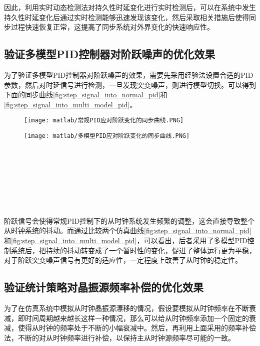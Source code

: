 因此，利用实时动态检测法对持久性时延变化进行实时检测后，可以在系统中发生持久性时延变化后通过实时检测能够迅速发现该变化，然后采取相关措施后使得同步过程快速恢复正常，这提高了同步系统对外界变化的快速响应性。

\subsection{验证多模型PID控制器对阶跃噪声的优化效果}
为了验证多模型PID控制器对阶跃噪声的效果，需要先采用经验法设置合适的PID参数，然后对时延信号进行检测，一旦发现突变噪声，则进行模型切换。可以得到下面的同步曲线\ref{fig:step_signal_into_normal_pid}和\ref{fig:step_signal_into_multi_model_pid}。
\begin{figure}[!hbp]
  \centering
  \begin{minipage}[b]{0.7\textwidth}
   \captionstyle{\centering}
   \centering
   \texttt{[image: matlab/常规PID应对阶跃变化的同步曲线.PNG]}
  \end{minipage}     
\end{figure}
\begin{figure}[htbp]
  \centering
  \begin{minipage}[b]{0.7\textwidth}
   \captionstyle{\centering}
   \centering
   \texttt{[image: matlab/多模型PID应对阶跃变化的同步曲线.PNG]}
  \end{minipage}     
\end{figure}
\\ \\ \\ \\ \\ \\ \\

阶跃信号会使得常规PID控制下的从时钟系统发生频繁的调整，这会直接导致整个从时钟系统的抖动。而通过比较两个仿真曲线\ref{fig:step_signal_into_normal_pid}和\ref{fig:step_signal_into_multi_model_pid}，可以看出，后者采用了多模型PID控制系统后，把持续的抖动转变成了一个暂时性的变化，促进了整体运行更为平稳，对于阶跃突变噪声信号有更好的适应性，一定程度上改善了从时钟的稳定性。

\subsection{验证统计策略对晶振源频率补偿的优化效果}
为了在仿真系统中模拟从时钟晶振源漂移的情况，假设要模拟从时钟频率在不断衰减，即时间周期越来越长这样一种情况，那么可以给从时钟频率添加一个固定的衰减，使得从时钟的频率处于不断的小幅衰减中。然后，再利用上面采用的频率补偿法，不断的对从时钟频率进行补偿，以保持主从时钟源频率尽可能的一致。

